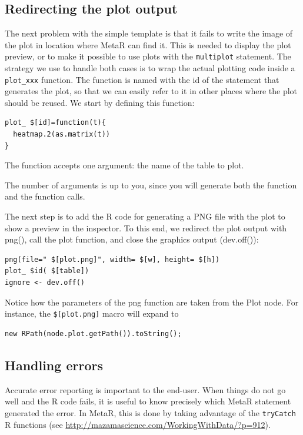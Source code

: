 \subsection{Redirecting the plot output}
The next problem with the simple template is that it fails to write the image of the plot in  location where MetaR can find it. This is needed to display the plot preview, or to make it possible to use plots with the \texttt{multiplot} statement.
The strategy we use to handle both cases is to wrap the actual plotting code inside a \texttt{plot\_xxx} function. The function is named with the id of the statement that generates the plot, so that we can easily refer to it in other places where the plot should be reused. We start by defining this function:

\begin{lstlisting}
plot_ $[id]=function(t){                        
  heatmap.2(as.matrix(t)) 
}                                             
\end{lstlisting}

The function accepts one argument: the name of the table to plot. 

\begin{remark}
The number of arguments is up to you, since you will generate both the function and the function calls.

\end{remark}

The next step is to add the R code for generating a PNG file with the plot to show a preview in the inspector. To this end, we redirect the plot output with png(), call the plot function, and close the graphics output (dev.off()):

\begin{lstlisting}
png(file=" $[plot.png]", width= $[w], height= $[h])
plot_ $id( $[table])                           
ignore <- dev.off()                          
\end{lstlisting}
Notice how the parameters of the png function are taken from the Plot node.
For instance, the \texttt{\$[plot.png]} macro will expand to 

\begin{lstlisting}
new RPath(node.plot.getPath()).toString();
\end{lstlisting}


\subsection{Handling errors}
Accurate error reporting is important to the end-user. When things do not go well and the R code fails, it is useful to know precisely which MetaR statement generated the error. In MetaR, this is done by taking advantage of the \texttt{tryCatch} R functions (see \url{http://mazamascience.com/WorkingWithData/?p=912}). 

